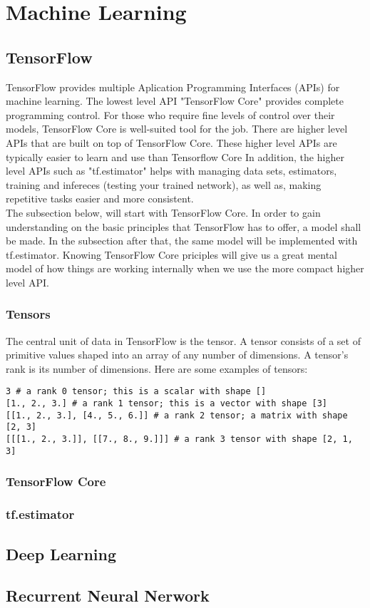 \chapter{Machine Learning}\label{ch:machine_learning}

\section{TensorFlow}
TensorFlow provides multiple Aplication Programming Interfaces (APIs) for machine learning. The lowest level API "TensorFlow Core" provides complete programming control. For those who require fine levels of control over their models, TensorFlow Core is well-suited tool for the job. There are higher level APIs that are built on top of TensorFlow Core. These higher level APIs are typically easier to learn and use than Tensorflow Core  In addition, the higher level APIs such as "tf.estimator" helps with managing data sets, estimators, training and infereces (testing your trained network), as well as, making repetitive tasks easier and more consistent.\\

The subsection below, will start with TensorFlow Core. In order to gain understanding on the basic principles that TensorFlow has to offer, a model shall be made. In the subsection after that, the same model will be implemented with tf.estimator. Knowing TensorFlow Core priciples will give us a great mental model of how things are working internally when we use the more compact higher level API.

\subsection{Tensors}
The central unit of data in TensorFlow is the tensor. A tensor consists of a set of primitive values shaped into an array of any number of dimensions. A tensor's rank is its number of dimensions. Here are some examples of tensors:

\begin{lstlisting}
3 # a rank 0 tensor; this is a scalar with shape []
[1., 2., 3.] # a rank 1 tensor; this is a vector with shape [3]
[[1., 2., 3.], [4., 5., 6.]] # a rank 2 tensor; a matrix with shape [2, 3]
[[[1., 2., 3.]], [[7., 8., 9.]]] # a rank 3 tensor with shape [2, 1, 3]
\end{lstlisting}

\subsection{TensorFlow Core}


\subsection{tf.estimator}


\section{Deep Learning}

\section{Recurrent Neural Nerwork}


